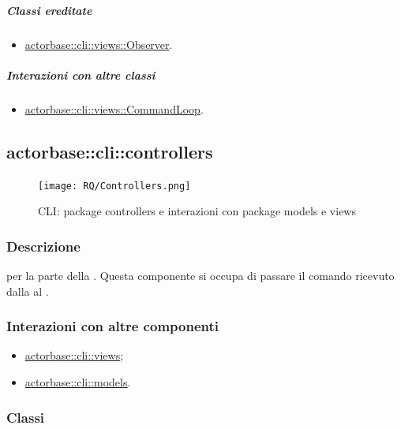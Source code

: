\documentclass{scalatekids-article}
\begin{document}
\subparagraph{Classi ereditate}

\begin{itemize}
\item \hyperref[sec:actorbase::cli::views::Observer]{actorbase::cli::views::Observer}.
\end{itemize}

\subparagraph{Interazioni con altre classi}

\begin{itemize}
\item \hyperref[sec:actorbase::cli::views::CommandLoop]{actorbase::cli::views::CommandLoop}.
\end{itemize}

\subsection{actorbase::cli::controllers}
\label{sec:actorbase::cli::controllers}

\begin{figure}[H]
  \begin{center}
    \texttt{[image: RQ/Controllers.png]}
    \caption{CLI: package controllers e interazioni con package models e views}
  \end{center}
\end{figure}

\subsubsection{Descrizione}

 per la parte  della . Questa
componente si occupa di passare il comando ricevuto dalla  al
.

\subsubsection{Interazioni con altre componenti}

\begin{itemize}
\item \hyperref[sec:actorbase::cli::views]{actorbase::cli::views};
\item \hyperref[sec:actorbase::cli::models]{actorbase::cli::models}.
\end{itemize}

\subsubsection{Classi}
\end{document}

